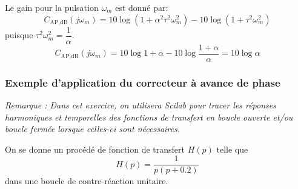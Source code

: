 Le gain pour la pulsation $\omega_m$ est donné par:
\[
    C_{\text{AP},\si{\dB}}(j\omega_m)=10\log{(1+\alpha^2\tau^2\omega_m^2)}-
                               10\log{(1+\tau^2\omega_m^2)}
\]
puisque $\tau^2\omega_m^2=\dfrac{1}{\alpha}$.
\[
    C_{\text{AP},\si{\dB}}(j\omega_m)=
    10\log{1+\alpha}-10\log{\dfrac{1+\alpha}{\alpha}}=10\log{\alpha}
\]
\subsubsection*{Exemple d'application du correcteur à avance de phase}
\emph{Remarque : Dans cet exercice, on utilisera Scilab pour tracer les 
réponses harmoniques et temporelles des fonctions de transfert en 
boucle ouverte et/ou boucle fermée lorsque celles-ci sont nécessaires.}

On se donne un procédé de fonction de transfert $H(p)$ telle que
\[
    H(p)=\dfrac{1}{p(p+0.2)}
\]
dans une boucle de contre-réaction unitaire.

